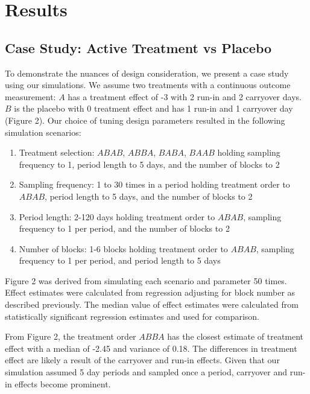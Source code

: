 \documentclass[11pt,]{article}
\providecommand{\tightlist}{%
  \setlength{\itemsep}{0pt}\setlength{\parskip}{0pt}}
\begin{document}
\section{Results}\label{results}

\subsection{Case Study: Active Treatment vs
Placebo}\label{case-study-active-treatment-vs-placebo}

To demonstrate the nuances of design consideration, we present a case
study using our simulations. We assume two treatments with a continuous
outcome measurement: \(A\) has a treatment effect of -3 with 2 run-in
and 2 carryover days. \(B\) is the placebo with 0 treatment effect and
has 1 run-in and 1 carryover day (Figure 2). Our choice of tuning design
parameters resulted in the following simulation scenarios:

\begin{enumerate}
\def\labelenumi{\arabic{enumi}.}
\tightlist
\item
  Treatment selection: \(ABAB\), \(ABBA\), \(BABA\), \(BAAB\) holding
  sampling frequency to 1, period length to 5 days, and the number of
  blocks to 2
\item
  Sampling frequency: 1 to 30 times in a period holding treatment order
  to \(ABAB\), period length to 5 days, and the number of blocks to 2
\item
  Period length: 2-120 days holding treatment order to \(ABAB\),
  sampling frequency to 1 per period, and the number of blocks to 2
\item
  Number of blocks: 1-6 blocks holding treatment order to \(ABAB\),
  sampling frequency to 1 per period, and period length to 5 days
\end{enumerate}

Figure 2 was derived from simulating each scenario and parameter 50
times. Effect estimates were calculated from regression adjusting for
block number as described previously. The median value of effect
estimates were calculated from statistically significant regression
estimates and used for comparison.

From Figure 2, the treatment order \(ABBA\) has the closest estimate of
treatment effect with a median of -2.45 and variance of 0.18. The
differences in treatment effect are likely a result of the carryover and
run-in effects. Given that our simulation assumed 5 day periods and
sampled once a period, carryover and run-in effects become prominent.
\end{document}

